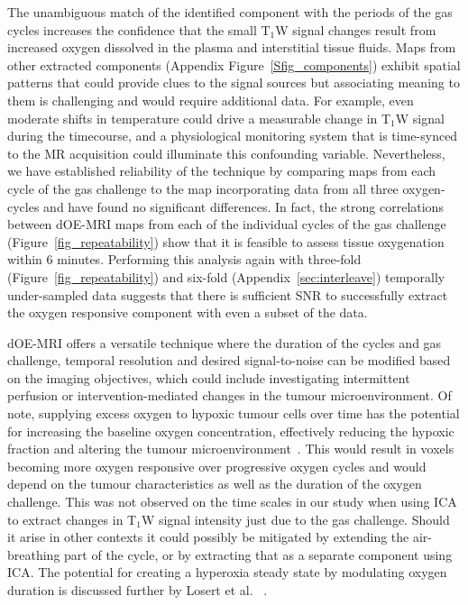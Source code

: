 The unambiguous match of the identified component with the periods of the gas cycles increases the confidence that the small T$_1$W signal changes result from increased oxygen dissolved in the plasma and interstitial tissue fluids.
Maps from other extracted components (Appendix Figure~\ref{Sfig_components}) exhibit spatial patterns that could provide clues to the signal sources but associating meaning to them is challenging and would require additional data.
For example, even moderate shifts in temperature could drive a measurable change in T$_1$W signal during the timecourse, and a physiological monitoring system that is time-synced to the MR acquisition could illuminate this confounding variable. 
Nevertheless, we have established reliability of the technique by comparing maps from each cycle of the gas challenge to the map incorporating data from all three oxygen-cycles and have found no significant differences.
In fact, the strong correlations between \ac{dOE-MRI} maps from each of the individual cycles of the gas challenge (Figure~\ref{fig_repeatability}) show that it is feasible to assess tissue oxygenation within 6 minutes.
Performing this analysis again with three-fold (Figure~\ref{fig_repeatability}) and six-fold (Appendix~\ref{sec:interleave}) temporally under-sampled data suggests that there is sufficient \ac{SNR} to successfully extract the oxygen responsive component  with even a subset of the data.

dOE-MRI offers a versatile technique where the duration of the cycles and gas challenge, temporal resolution and desired signal-to-noise can be modified based on the imaging objectives, which could include investigating intermittent perfusion or intervention-mediated changes in the tumour microenvironment. 
Of note, supplying excess oxygen to hypoxic tumour cells over time has the potential for increasing the baseline oxygen concentration, effectively reducing the hypoxic fraction and altering the tumour microenvironment~\cite{Linnik:2013hf}.
This would result in voxels becoming more oxygen responsive over progressive oxygen cycles and would depend on the tumour characteristics as well as the duration of the oxygen challenge.
This was not observed on the time scales in our study when using \ac{ICA} to extract changes in T$_1$W signal intensity just due to the gas challenge. 
Should it arise in other contexts it could possibly be mitigated by extending the air-breathing part of the cycle, or by extracting that as a separate component using \ac{ICA}.
The potential for creating a hyperoxia steady state by modulating oxygen duration is discussed further by Losert et al. ~\cite{Losert:2002gt}.

